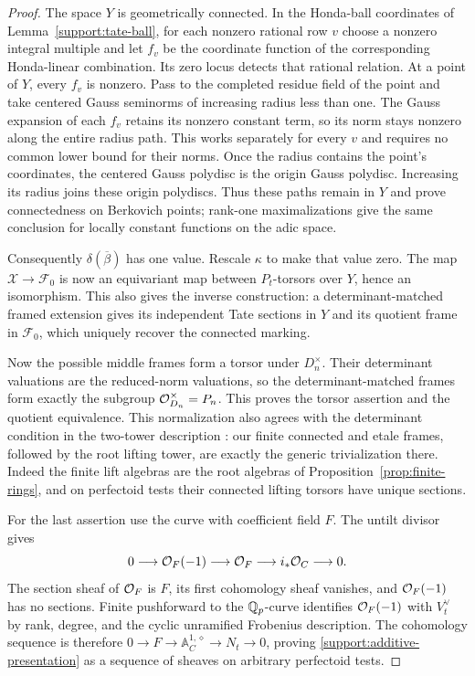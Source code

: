 \begin{proof}
The space $Y$ is geometrically connected.  In the Honda-ball
coordinates of Lemma~\ref{support:tate-ball}, for each nonzero
rational row $v$ choose a nonzero integral multiple and let $f_v$
be the coordinate function of the corresponding Honda-linear
combination.  Its zero locus detects that rational relation.
At a point of $Y$, every $f_v$ is nonzero.  Pass to the completed
residue field of the point and take centered Gauss seminorms of
increasing radius less than one.  The Gauss expansion of each $f_v$
retains its nonzero constant term, so its norm stays nonzero along
the entire radius path.  This works separately for every $v$ and
requires no common lower bound for their norms.  Once the radius
contains the point's coordinates, the centered Gauss polydisc is
the origin Gauss polydisc.  Increasing its radius joins these
origin polydiscs.  Thus these paths remain in $Y$ and prove
connectedness on Berkovich points; rank-one maximalizations give
the same conclusion for locally constant functions on the adic
space.

Consequently $\delta(\overline\beta)$ has one value.  Rescale
$\kappa$ to make that value zero.  The map
$\mathcal X\to\mathscr F_0$ is now an equivariant map between
$P_t$-torsors over $Y$, hence an isomorphism.  This also gives the
inverse construction: a determinant-matched framed extension gives
its independent Tate sections in $Y$ and its quotient frame in
$\mathscr F_0$, which uniquely recover the connected marking.

Now the possible middle frames form a torsor under $D_n^\times$.
Their determinant valuations are the reduced-norm valuations, so
the determinant-matched frames form exactly the subgroup
$\mathcal O_{D_n}^\times=P_n$.  This proves the torsor assertion and the
quotient equivalence.  This normalization also agrees with the
determinant condition in the two-tower description
\cite[Theorem~2.0.1]{BMR}: our finite connected and etale frames,
followed by the root lifting tower, are exactly the generic
trivialization there.  Indeed the finite lift algebras are the root
algebras of Proposition~\ref{prop:finite-rings}, and on perfectoid
tests their connected lifting torsors have unique sections.

For the last assertion use the curve with coefficient field $F$.
The untilt divisor gives
\[
 0\longrightarrow\mathcal O_F(-1)\longrightarrow\mathcal O_F
 \longrightarrow i_*\mathcal O_C\longrightarrow0.
\]
The section sheaf of $\mathcal O_F$ is $F$, its first cohomology sheaf
vanishes, and $\mathcal O_F(-1)$ has no sections.  Finite pushforward to
the $\mathbb Q_p$-curve identifies $\mathcal O_F(-1)$ with $V_t^\vee$ by rank,
degree, and the cyclic unramified Frobenius description.  The
cohomology sequence is therefore $0\to F\to\mathbb A_C^{1,\diamond}
\to N_t\to0$, proving \eqref{support:additive-presentation} as a
sequence of sheaves on arbitrary perfectoid tests.
\end{proof}

